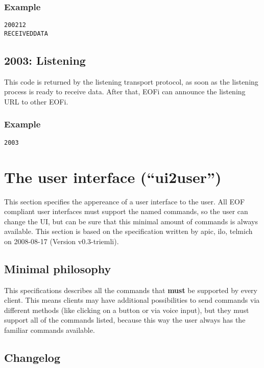 \documentclass[12pt,a4paper]{book}
\begin{document}
\subsubsection{Example}
\begin{verbatim}
200212
RECEIVEDDATA
\end{verbatim}
\subsection{2003: Listening}
This code is returned by the listening transport protocol, as soon as the
listening process is ready to receive data. After that, EOFi can announce
the listening URL to other EOFi.
\subsubsection{Example}
\begin{verbatim}
2003
\end{verbatim}
\section{The user interface ("`ui2user"')}
This section specifies the appereance of a user interface to the user.
All EOF compliant user interfaces must support the named commands, so the
user can change the UI, but can be sure that this minimal amount of
commands is always available.  This section is based on the specification
written by apic, ilo, telmich on 2008-08-17 (Version v0.3-triemli).

\subsection{Minimal philosophy}
This specifications describes all the commands that \textbf{must} be
supported by every client. This means clients may have additional possibilities
to send commands via different methods (like clicking on a button or via
voice input), but they must support all of the commands listed, because this
way the user always has the familiar commands available.

\subsection{Changelog}
\end{document}
